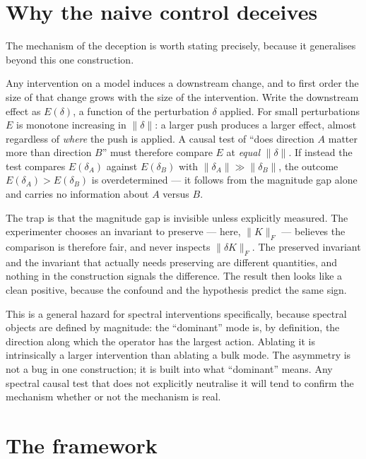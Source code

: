 \documentclass[11pt]{article}
\begin{document}
\section{Why the naive control deceives}
\label{sec:why}

The mechanism of the deception is worth stating precisely, because it
generalises beyond this one construction.

Any intervention on a model induces a downstream change, and to first
order the size of that change grows with the size of the intervention.
Write the downstream effect as $E(\delta)$, a function of the perturbation
$\delta$ applied. For small perturbations $E$ is monotone increasing in
$\|\delta\|$: a larger push produces a larger effect, almost regardless of
\emph{where} the push is applied. A causal test of ``does direction $A$
matter more than direction $B$'' must therefore compare $E$ at
\emph{equal} $\|\delta\|$. If instead the test compares
$E(\delta_A)$ against $E(\delta_B)$ with $\|\delta_A\|\gg\|\delta_B\|$,
the outcome $E(\delta_A)>E(\delta_B)$ is overdetermined --- it follows from
the magnitude gap alone and carries no information about $A$ versus $B$.

The trap is that the magnitude gap is invisible unless explicitly
measured. The experimenter chooses an invariant to preserve --- here,
$\|K\|_F$ --- believes the comparison is therefore fair, and never inspects
$\|\delta K\|_F$. The preserved invariant and the invariant that actually
needs preserving are different quantities, and nothing in the construction
signals the difference. The result then looks like a clean positive,
because the confound and the hypothesis predict the same sign.

This is a general hazard for spectral interventions specifically, because
spectral objects are defined by magnitude: the ``dominant'' mode is, by
definition, the direction along which the operator has the largest action.
Ablating it is intrinsically a larger intervention than ablating a bulk
mode. The asymmetry is not a bug in one construction; it is built into
what ``dominant'' means. Any spectral causal test that does not
explicitly neutralise it will tend to confirm the mechanism whether or not
the mechanism is real.

\section{The framework}
\label{sec:framework}
\end{document}
